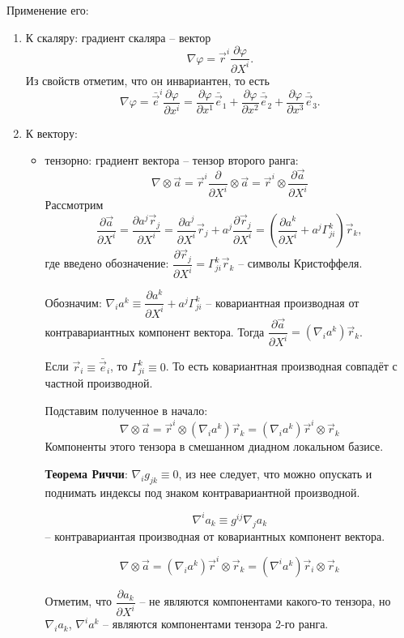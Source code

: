 Применение его:
\begin{enumerate}
  \item К скаляру: градиент скаляра -- вектор
    \[
      \nabla \varphi = \vec{r}^i \dfrac{\partial \varphi}{\partial X^i}.
    \]
    Из свойств отметим, что он инвариантен, то есть 
    \[
      \nabla \varphi = \bar{\vec{e}}^i \dfrac{\partial \varphi}{\partial x^i} 
      = \dfrac{\partial \varphi}{\partial x^1} \bar{\vec{e}}_1 + \dfrac{\partial \varphi}{\partial x^2} \bar{\vec{e}}_2 + \dfrac{\partial \varphi}{\partial x^3} \bar{\vec{e}}_3.
    \]

  \item К вектору:
    \begin{itemize}
      \item тензорно: градиент вектора -- тензор второго ранга:
        \[
          \nabla \otimes \vec{a}
          = \vec{r}^i \dfrac{\partial }{\partial X^i} \otimes \vec{a}
          = \vec{r}^i \otimes \dfrac{\partial \vec{a}}{\partial X^i} 
        \]
        Рассмотрим
        \[
          \dfrac{\partial \vec{a}}{\partial X^i} 
          = \dfrac{\partial a^j \vec{r}_j}{\partial X^i} 
          = \dfrac{\partial a^j}{\partial X^i} \vec{r}_j
            + a^j \dfrac{\partial \vec{r}_j}{\partial X^i} 
            = \left( \dfrac{\partial a^k}{\partial X^i} + a^j \Gamma^k_{ji} \right) \vec{r}_k,
        \]
        где введено обозначение:
        $ \dfrac{\partial \vec{r}_j}{\partial X^i} 
          = \Gamma^k_{ji} \vec{r}_k $
        -- символы Кристоффеля.

        Обозначим: $\nabla_i a^k \equiv \dfrac{\partial a^k}{\partial X^i} + a^j \Gamma^k_{ji}$
        -- ковариантная производная от контравариантных компонент вектора.
        Тогда $ \dfrac{\partial \vec{a}}{\partial X^i} = (\nabla_i a^k) \vec{r}_k$.

        Если $\vec{r}_i \equiv \bar{\vec{e}}_i$, то $\Gamma^k_{ji} \equiv 0$. То есть
        ковариантная производная совпадёт с частной производной.

        Подставим полученное в начало:
        \[
          \nabla \otimes \vec{a} = \vec{r}^i \otimes (\nabla_i a^k) \vec{r}_k 
          = (\nabla_i a^k) \vec{r}^i \otimes \vec{r}_k
        \]
        Компоненты этого тензора в смешанном диадном локальном базисе.

        \textbf{Теорема Риччи}: $\nabla_i g_{jk} \equiv 0$, из нее следует, что можно опускать и 
        поднимать индексы под знаком контравариантной производной.

        \[
          \nabla^i a_k \equiv g^{ij} \nabla_j a_k
        \]
        -- контравариантая производная от ковариантных компонент вектора.

\[
          \nabla \otimes \vec{a}
          = (\nabla_i a^k) \vec{r}^i \otimes \vec{r}_k
          = (\nabla^i a^k) \vec{r}_i \otimes \vec{r}_k
        \]

        Отметим, что $ \dfrac{\partial a_k}{\partial X^i} $ -- не являются компонентами какого-то
        тензора, но $\nabla_i a_k$, $\nabla^i a^k$ -- являются компонентами тензора 2-го ранга.

    \end{itemize}
\end{enumerate}


